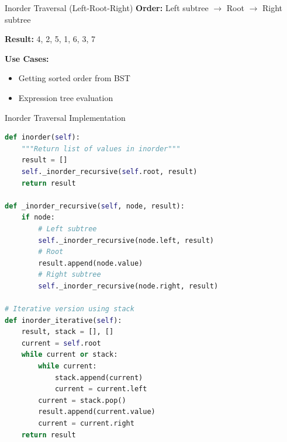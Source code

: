 \documentclass[aspectratio=169]{beamer}
\begin{document}
\begin{frame}{Inorder Traversal (Left-Root-Right)}
  \textbf{Order:} Left subtree $\rightarrow$ Root $\rightarrow$ Right subtree

  \vspace{0.3cm}
  \begin{center}
  \end{center}

  \textbf{Result:} 4, 2, 5, 1, 6, 3, 7

  \vspace{0.3cm}
  \textbf{Use Cases:}
  \begin{itemize}
    \item Getting sorted order from BST
    \item Expression tree evaluation
  \end{itemize}
\end{frame}

\begin{frame}[fragile]{Inorder Traversal Implementation}
  \begin{lstlisting}[language=Python, basicstyle=\ttfamily\small]
def inorder(self):
    """Return list of values in inorder"""
    result = []
    self._inorder_recursive(self.root, result)
    return result

def _inorder_recursive(self, node, result):
    if node:
        # Left subtree
        self._inorder_recursive(node.left, result)
        # Root
        result.append(node.value)
        # Right subtree
        self._inorder_recursive(node.right, result)

# Iterative version using stack
def inorder_iterative(self):
    result, stack = [], []
    current = self.root
    while current or stack:
        while current:
            stack.append(current)
            current = current.left
        current = stack.pop()
        result.append(current.value)
        current = current.right
    return result
  \end{lstlisting}
\end{frame}
\end{document}
